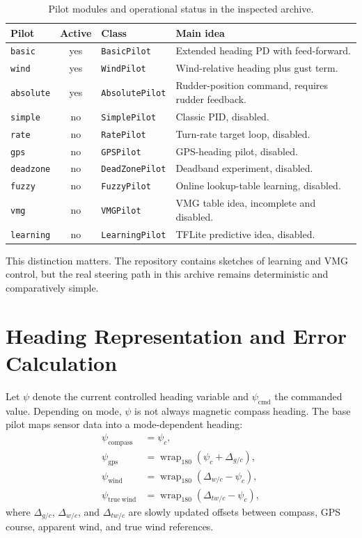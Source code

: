 \documentclass[11pt,twocolumn]{article}
\newcommand{\wrap}{\operatorname{wrap}_{180}}
\newcommand{\heading}{\psi}
\newcommand{\cmd}{\mathrm{cmd}}
\begin{document}
\begin{table}[h]
\centering
\caption{Pilot modules and operational status in the inspected archive.}
\label{tab:pilots}
\begin{tabularx}{\columnwidth}{@{}Z{0.19\columnwidth}cZ{0.24\columnwidth}Y@{}}
\toprule
Pilot & Active & Class & Main idea \\
\midrule
\texttt{basic} & yes & \texttt{BasicPilot} & Extended heading PD with feed-forward. \\
\texttt{wind} & yes & \texttt{WindPilot} & Wind-relative heading plus gust term. \\
\texttt{absolute} & yes & \texttt{AbsolutePilot} & Rudder-position command, requires rudder feedback. \\
\texttt{simple} & no & \texttt{SimplePilot} & Classic PID, disabled. \\
\texttt{rate} & no & \texttt{RatePilot} & Turn-rate target loop, disabled. \\
\texttt{gps} & no & \texttt{GPSPilot} & GPS-heading pilot, disabled. \\
\texttt{deadzone} & no & \texttt{DeadZonePilot} & Deadband experiment, disabled. \\
\texttt{fuzzy} & no & \texttt{FuzzyPilot} & Online lookup-table learning, disabled. \\
\texttt{vmg} & no & \texttt{VMGPilot} & VMG table idea, incomplete and disabled. \\
\texttt{learning} & no & \texttt{LearningPilot} & TFLite predictive idea, disabled. \\
\bottomrule
\end{tabularx}
\end{table}

This distinction matters.  The repository contains sketches of learning and VMG control,
but the real steering path in this archive remains deterministic and comparatively simple.

\section{Heading Representation and Error Calculation}

Let \(\heading\) denote the current controlled heading variable and
\(\heading_{\cmd}\) the commanded value.  Depending on mode, \(\heading\) is not always
magnetic compass heading.  The base pilot maps sensor data into a mode-dependent heading:
\begin{align}
\heading_{\mathrm{compass}} &= \heading_c, \\
\heading_{\mathrm{gps}} &= \wrap(\heading_c + \Delta_{g/c}), \\
\heading_{\mathrm{wind}} &= \wrap(\Delta_{w/c} - \heading_c), \\
\heading_{\mathrm{true\ wind}} &= \wrap(\Delta_{tw/c} - \heading_c),
\end{align}
where \(\Delta_{g/c}\), \(\Delta_{w/c}\), and \(\Delta_{tw/c}\) are slowly updated offsets
between compass, GPS course, apparent wind, and true wind references.
\end{document}
